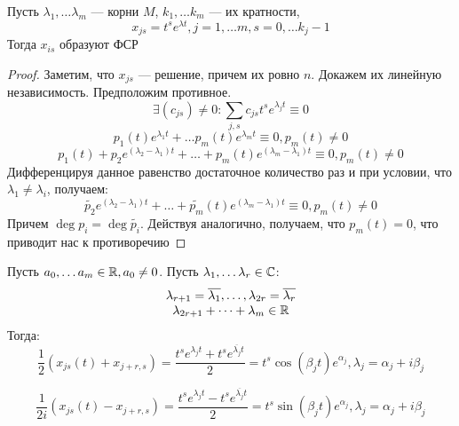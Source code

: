 \begin{theorem}
    Пусть \(\lambda_1, \dots \lambda_m\) --- корни \(M\), \(k_1, \dots k_m\) --- их кратности, 
    \[x_{js} = t^se^{\lambda t}, j = 1, \dots m, s = 0, \dots k_j - 1\]
    Тогда \(x_{is}\) образуют ФСР
\end{theorem}
\begin{proof}
    Заметим, что \(x_{js}\) --- решение, причем их ровно \(n\). Докажем их линейную независимость. Предположим противное.
    \[\exists (c_{js}) \ne 0: \sum_{j, s} c_{js}t^se^{\lambda_j t} \equiv 0\]
    \[p_1(t)e^{\lambda_1 t} + \dots p_m(t)e^{\lambda_m t} \equiv 0, p_m(t) \ne 0\]
    \[p_1(t) + p_2e^{(\lambda_2 - \lambda_1)t} + \dots + p_m(t)e^{(\lambda_m - \lambda_1)t} \equiv 0, p_m(t) \ne 0\]
    Дифференцируя данное равенство достаточное количество раз и при условии, что \(\lambda_1 \ne \lambda_i\), получаем:
    \[\tilde{p_2}e^{(\lambda_2 - \lambda_1)t} + \dots + \tilde{p_m}(t)e^{(\lambda_m - \lambda_1)t} \equiv 0, p_m(t) \ne 0\]
    Причем \(\deg p_i = \deg \tilde{p_i}\). 
    Действуя аналогично, получаем, что \(p_m(t) = 0\), что приводит нас к противоречию
\end{proof}

Пусть \(a_0, \dots a_m \in \mathbb{R}, a_0 \ne 0\). Пусть \(\lambda_1, \dots \lambda_r \in \mathbb{C}\):
\[\begin{array}{c}
    \lambda_{r + 1} = \overline{\lambda_1}, \dots, \lambda_{2r} = \overline{\lambda_r} \\
    \lambda_{2r + 1} + \dots + \lambda_m \in \mathbb{R}
\end{array}\]
Тогда:
\[\frac{1}{2}\left( x_{js}(t) + x_{j + r, s} \right) = \frac{t^se^{\lambda_j t} + t^s e^{\overline{\lambda_j}t}}{2} = t^s \cos (\beta_j t)e^{\alpha_j}, \lambda_j = \alpha_j + i\beta_j\]

\[\frac{1}{2i}\left( x_{js}(t) - x_{j + r, s} \right) = \frac{t^se^{\lambda_j t} - t^s e^{\overline{\lambda_j}t}}{2} = t^s \sin (\beta_j t)e^{\alpha_j}, \lambda_j = \alpha_j + i\beta_j\]

